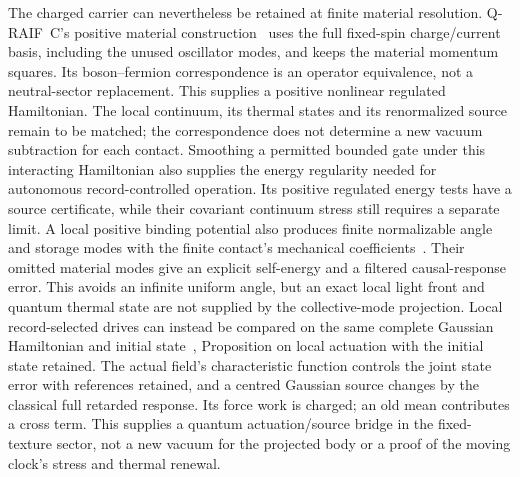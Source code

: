 The charged carrier can nevertheless be retained at finite material
resolution. Q-RAIF~C's positive material construction~\cite{QRC}
uses the full fixed-spin charge/current basis, including the unused
oscillator modes, and keeps the material momentum squares. Its
boson--fermion correspondence is an operator equivalence, not a
neutral-sector replacement. This supplies a positive nonlinear
regulated Hamiltonian. The local continuum, its thermal states and
its renormalized source remain to be matched; the correspondence
does not determine a new vacuum subtraction for each contact.
Smoothing a permitted bounded gate under this interacting Hamiltonian
also supplies the energy regularity needed for autonomous
record-controlled operation. Its positive regulated energy tests
have a source certificate, while their covariant continuum stress
still requires a separate limit.
A local positive binding potential also produces finite normalizable
angle and storage modes with the finite contact's mechanical
coefficients~\cite{QRC}. Their omitted material modes give an explicit
self-energy and a filtered causal-response error. This avoids an
infinite uniform angle, but an exact local light front and quantum
thermal state are not supplied by the collective-mode projection.
Local record-selected drives can instead be compared on the same
complete Gaussian Hamiltonian and initial state~\cite{QRC},
Proposition on local actuation with the initial state retained.
The actual field's characteristic function controls the joint state
error with references retained, and a centred Gaussian source changes
by the classical full retarded response. Its force work is charged;
an old mean contributes a cross term. This supplies a quantum
actuation/source bridge in the fixed-texture sector, not a new vacuum
for the projected body or a proof of the moving clock's stress and
thermal renewal.

